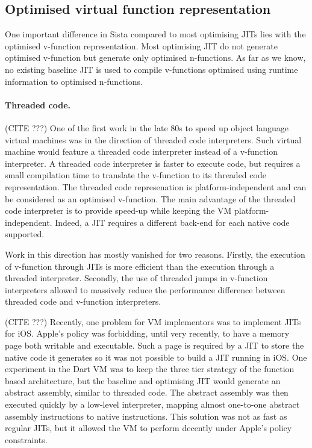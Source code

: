 \documentclass[a4paper,12pt,twoside]{../includes/ThesisStyle}
\begin{document}
\subsection{Optimised virtual function representation}
\label{sec:interface}

One important difference in Sista compared to most optimising JITs lies with the optimised v-function representation. Most optimising JIT do not generate optimised v-function but generate only optimised n-functions. As far as we know, no existing baseline JIT is used to compile v-functions optimised using runtime information to optimised n-functions.

\paragraph{Threaded code.}
(CITE ???)
One of the first work in the late 80s to speed up object language virtual machines was in the direction of threaded code interpreters. Such virtual machine would feature a threaded code interpreter instead of a v-function interpreter. A threaded code interpreter is faster to execute code, but requires a small compilation time to translate the v-function to its threaded code representation. The threaded code represenation is platform-independent and can be considered as an optimised v-function. The main advantage of the threaded code interpreter is to provide speed-up while keeping the VM platform-independent. Indeed, a JIT requires a different back-end for each native code supported. 

Work in this direction has mostly vanished for two reasons. Firstly, the execution of v-function through JITs is more efficient than the execution through a threaded interpreter. Secondly, the use of threaded jumps in v-function interpreters allowed to massively reduce the performance difference between threaded code and v-function interpreters.

(CITE ???)
Recently, one problem for VM implementors was to implement JITs for iOS. Apple's policy was forbidding, until very recently, to have a memory page both writable and executable. Such a page is required by a JIT to store the native code it generates so it was not possible to build a JIT running in iOS. One experiment in the Dart VM was to keep the three tier strategy of the function based architecture, but the baseline and optimising JIT would generate an abstract assembly, similar to threaded code. The abstract assembly was then executed quickly by a low-level interpreter, mapping almost one-to-one abstract assembly instructions to native instructions. This solution was not as fast as regular JITs, but it allowed the VM to perform decently under Apple's policy constraints.
\end{document}
